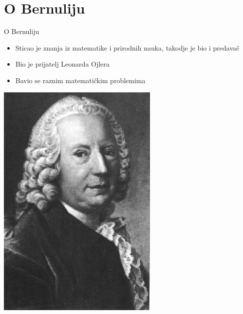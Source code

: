 \documentclass[xcolor=dvipsnames]{beamer}
\begin{document}
     \section{O Bernuliju}
    \begin{frame}
    \begin{block}{O Bernuliju}
    \begin{itemize}
        \item Sticao je znanja iz matematike i
          prirodnih nauka, takodje je bio i predavač\\
        \item Bio je prijatelj Leonarda Ojlera\\
        \item Bavio se raznim matematičkim problemima\\
    \end{itemize}
   \end{block}
    \begin{center}
    \includegraphics[height=4.cm]{bernuli.jpg}
    \end{center}
  \end{frame}
        
\end{document}
